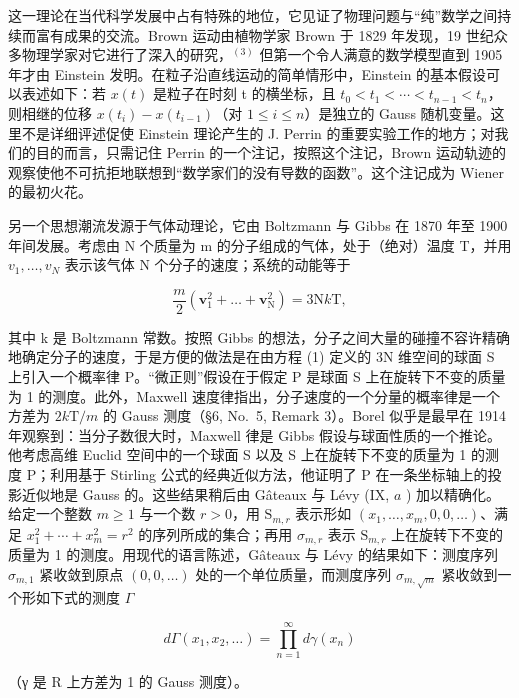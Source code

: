 
这一理论在当代科学发展中占有特殊的地位，它见证了物理问题与“纯”数学之间持续而富有成果的交流。Brown 运动由植物学家 Brown 于 1829 年发现，19 世纪众多物理学家对它进行了深入的研究，\(^{(3)}\) 但第一个令人满意的数学模型直到 1905 年才由 Einstein 发明。在粒子沿直线运动的简单情形中，Einstein 的基本假设可以表述如下：若 \(x(t)\) 是粒子在时刻 t 的横坐标，且 \(t_{0} < t_{1} < \cdots < t_{n-1} < t_{n}\)，则相继的位移 \(x(t_{i}) - x(t_{i-1})\)（对 \(1 \leqslant i \leqslant n\)）是独立的 Gauss 随机变量。这里不是详细评述促使 Einstein 理论产生的 J. Perrin 的重要实验工作的地方；对我们的目的而言，只需记住 Perrin 的一个注记，按照这个注记，Brown 运动轨迹的观察使他不可抗拒地联想到“数学家们的没有导数的函数”。这个注记成为 Wiener 的最初火花。

另一个思想潮流发源于气体动理论，它由 Boltzmann 与 Gibbs 在 1870 年至 1900 年间发展。考虑由 N 个质量为 m 的分子组成的气体，处于（绝对）温度 T，并用 \(v_{1},\ldots,v_{N}\) 表示该气体 N 个分子的速度；系统的动能等于

\[
\frac {m}{2} (\mathbf {v} _ {1} ^ {2} + \dots + \mathbf {v} _ {\mathrm{N}} ^ {2}) = 3 \mathrm{N} k \mathrm{T},\tag{1}
\]

其中 k 是 Boltzmann 常数。按照 Gibbs 的想法，分子之间大量的碰撞不容许精确地确定分子的速度，于是方便的做法是在由方程 (1) 定义的 3N 维空间的球面 S 上引入一个概率律 P。“微正则”假设在于假定 P 是球面 S 上在旋转下不变的质量为 1 的测度。此外，Maxwell 速度律指出，分子速度的一个分量的概率律是一个方差为 \(2k\mathrm{T} / m\) 的 Gauss 测度（§6, No.~5, Remark 3）。Borel 似乎是最早在 1914 年观察到：当分子数很大时，Maxwell 律是 Gibbs 假设与球面性质的一个推论。他考虑高维 Euclid 空间中的一个球面 S 以及 S 上在旋转下不变的质量为 1 的测度 P；利用基于 Stirling 公式的经典近似方法，他证明了 P 在一条坐标轴上的投影近似地是 Gauss 的。这些结果稍后由 Gâteaux 与 Lévy (IX, \(a\) ) 加以精确化。给定一个整数 \(m \geqslant 1\) 与一个数 \(r > 0\)，用 \(\mathrm{S}_{m,r}\) 表示形如 \((x_{1}, \ldots, x_{m}, 0, 0, \ldots)\)、满足 \(x_{1}^{2} + \cdots + x_{m}^{2} = r^{2}\) 的序列所成的集合；再用 \(\sigma_{m,r}\) 表示 \(\mathrm{S}_{m,r}\) 上在旋转下不变的质量为 1 的测度。用现代的语言陈述，Gâteaux 与 Lévy 的结果如下：测度序列 \(\sigma_{m,1}\) 紧收敛到原点 \((0, 0, \ldots)\) 处的一个单位质量，而测度序列 \(\sigma_{m,\sqrt{m}}\) 紧收敛到一个形如下式的测度 \(\Gamma\)

\[
d \Gamma (x _ {1}, x _ {2}, \dots) = \prod_ {n = 1} ^ {\infty} d \gamma (x _ {n})
\]

（γ 是 R 上方差为 1 的 Gauss 测度）。

